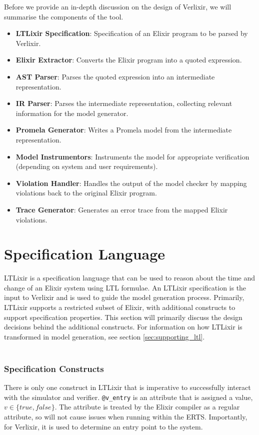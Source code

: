Before we provide an in-depth discussion on the design of Verlixir, we will summarise the components of the tool.
\begin{itemize}
    \item \textbf{LTLixir Specification}: Specification of an Elixir program to be parsed by Verlixir.
    \item \textbf{Elixir Extractor}: Converts the Elixir program into a quoted expression.
    \item \textbf{AST Parser}: Parses the quoted expression into an intermediate representation.
    \item \textbf{IR Parser}: Parses the intermediate representation, collecting relevant information for the model generator.
    \item \textbf{Promela Generator}: Writes a Promela model from the intermediate representation.
    \item \textbf{Model Instrumentors}: Instruments the model for appropriate verification (depending on system and user requirements).
    \item \textbf{Violation Handler}: Handles the output of the model checker by mapping violations back to the original Elixir program.
    \item \textbf{Trace Generator}: Generates an error trace from the mapped Elixir violations.
\end{itemize}
\section{Specification Language} \label{sec:specification_language}
LTLixir is a specification language that can be used to reason about the time and change of an Elixir system using LTL formulae. An LTLixir specification is the input to Verlixir and is used to guide the model generation process. Primarily, LTLixir supports a restricted subset of Elixir, with additional constructs to support specification properties. This section will primarily discuss the design decisions behind the additional constructs. For information on how LTLixir is transformed in model generation, see section \ref{sec:supporting_ltl}.
\\ \\
\subsubsection{Specification Constructs}
There is only one construct in LTLixir that is imperative to successfully interact with the simulator and verifier. \texttt{@v\_entry} is an attribute that is assigned a value, $v \in \{true, false\}$. The attribute is treated by the Elixir compiler as a regular attribute, so will not cause issues when running within the ERTS. Importantly, for Verlixir, it is used to determine an entry point to the system.
\\ \\
